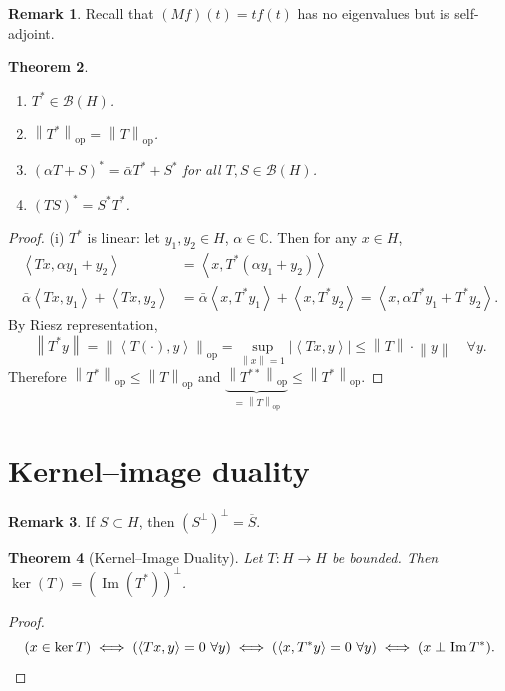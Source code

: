 \documentclass[12pt]{article}
\renewcommand{\Im}{\operatorname{Im}}
\newcommand{\abs}[1]{\left| #1 \right|}
\newcommand{\norm}[1]{\left\| #1 \right\|}
\newcommand{\ip}[2]{\left\langle #1, #2 \right\rangle}
\newcommand{\C}{\mathbb{C}}
\newcommand{\cB}{\mathcal{B}}
\newtheorem{thm}{Theorem}[section]
\theoremstyle{definition}
\newtheorem{rmk}[thm]{Remark}
\begin{document}
\begin{rmk}
	Recall that $(M f)(t) = t f(t)$ has no eigenvalues but is self-adjoint.
\end{rmk}

\begin{thm}
	\begin{enumerate}[label=(\roman*),nosep]
		\item $T^* \in \cB(H)$.
		\item $\norm{T^*}_{\mathrm{op}} = \norm{T}_{\mathrm{op}}$.
		\item $(\alpha T + S)^* = \bar{\alpha} T^* + S^*$ for all $T, S \in \cB(H)$.
		\item $(TS)^* = S^*T^*$.
	\end{enumerate}
\end{thm}
\begin{proof}
	(i) $T^*$ is linear: let $y_1, y_2 \in H$, $\alpha \in \C$.
	Then for any $x \in H$,
	\begin{align*}
		\ip{Tx}{\alpha y_1 + y_2} &= \ip{x}{T^*(\alpha y_1 + y_2)} \\
		\bar{\alpha} \ip{Tx}{y_1} + \ip{Tx}{y_2} &= \bar{\alpha}\ip{x}{T^*y_1} + \ip{x}{T^*y_2} = \ip{x}{\alpha T^*y_1 + T^*y_2}.
	\end{align*}
	By Riesz representation,
	\begin{equation*}
		\norm{T^*y} = \norm{\ip{T(\cdot)}{y}}_{\mathrm{op}} = \sup_{\norm{x}=1} \abs{\ip{Tx}{y}} \leq \norm{T} \cdot \norm{y} \quad \forall y.
	\end{equation*}
	Therefore $\norm{T^*}_{\mathrm{op}} \leq \norm{T}_{\mathrm{op}}$ and $\underbrace{\norm{T^{**}}_{\mathrm{op}}}_{= \norm{T}_{\mathrm{op}}} \leq \norm{T^*}_{\mathrm{op}}$.
\end{proof}

\section{Kernel--image duality}

\begin{rmk}
	If $S \subset H$, then $(S^\perp)^\perp = \overline{S}$.
\end{rmk}

\begin{thm}[Kernel--Image Duality]
	Let $T : H \to H$ be bounded.
	Then $\ker(T) = (\Im(T^*))^\perp$.
\end{thm}
\begin{proof}
	\begin{equation*}
		(x \in \ker T) \iff (\ip{Tx}{y} = 0 \ \forall y) \iff (\ip{x}{T^*y} = 0 \ \forall y) \iff (x \perp \Im T^*). \qedhere
	\end{equation*}
\end{proof}
\end{document}

